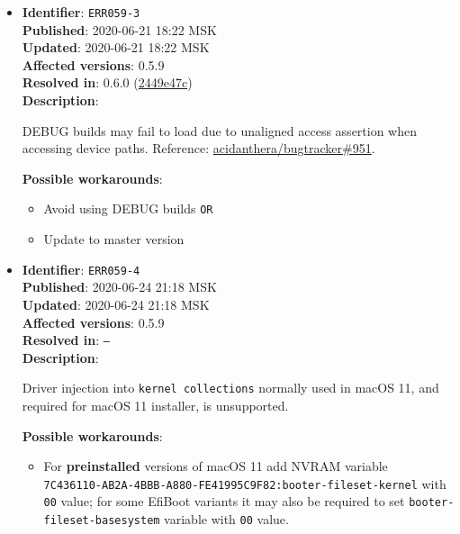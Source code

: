 \documentclass[]{article}
\providecommand{\tightlist}{%
  \setlength{\itemsep}{0pt}\setlength{\parskip}{0pt}}
\begin{document}
\begin{itemize}
\item
  \textbf{Identifier}: \texttt{ERR059-3} \\
  \textbf{Published}: 2020-06-21 18:22 MSK \\
  \textbf{Updated}: 2020-06-21 18:22 MSK \\
  \textbf{Affected versions}: 0.5.9 \\
  \textbf{Resolved in}: 0.6.0 (\href{https://github.com/acidanthera/OpenCorePkg/commit/2449e47cb2d110a288d491beee0b5b168d2bb480}{2449e47c}) \\
  \textbf{Description}:

  DEBUG builds may fail to load due to unaligned access assertion when accessing device paths.
  Reference: \href{https://github.com/acidanthera/bugtracker/issues/951}{acidanthera/bugtracker\#951}.

  \textbf{Possible workarounds}:
  \begin{itemize}
    \tightlist
    \item Avoid using DEBUG builds \texttt{OR}
    \item Update to master version
  \end{itemize}


\item
  \textbf{Identifier}: \texttt{ERR059-4} \\
  \textbf{Published}: 2020-06-24 21:18 MSK \\
  \textbf{Updated}: 2020-06-24 21:18 MSK \\
  \textbf{Affected versions}: 0.5.9 \\
  \textbf{Resolved in}: \texttt{--} \\
  \textbf{Description}:

  Driver injection into \texttt{kernel collections} normally used in macOS 11,
  and required for macOS 11 installer, is unsupported.

  \textbf{Possible workarounds}:
  \begin{itemize}
    \tightlist
    \item For \textbf{preinstalled} versions of macOS 11 add NVRAM variable \\
    \texttt{7C436110-AB2A-4BBB-A880-FE41995C9F82:booter-fileset-kernel}
    with \texttt{00} value; for some EfiBoot variants it may also be
    required to set \texttt{booter-fileset-basesystem} variable with \texttt{00} value.
  \end{itemize}


\end{itemize}
\end{document}
